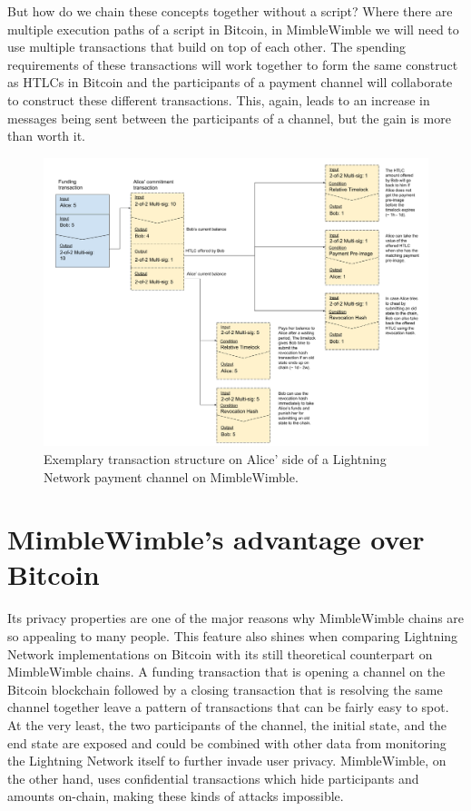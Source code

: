 \documentclass[letterpaper]{article}
\begin{document}
But how do we chain these concepts together without a script? Where there are multiple execution paths of a script in Bitcoin, in MimbleWimble we will need to use multiple transactions that build on top of each other. The spending requirements of these transactions will work together to form the same construct as HTLCs in Bitcoin and the participants of a payment channel will collaborate to construct these different transactions. This, again, leads to an increase in messages being sent between the participants of a channel, but the gain is more than worth it.

\begin{figure}[h]
	\centering
	\includegraphics[width=\textwidth]{lightning_mw_transactions_htlc}
	\caption{Exemplary transaction structure on Alice’ side of a Lightning Network payment channel on MimbleWimble.}
\end{figure}

\section{MimbleWimble's advantage over Bitcoin}
Its privacy properties are one of the major reasons why MimbleWimble chains are so appealing to many people. This feature also shines when comparing Lightning Network implementations on Bitcoin with its still theoretical counterpart on MimbleWimble chains. A funding transaction that is opening a channel on the Bitcoin blockchain followed by a closing transaction that is resolving the same channel together leave a pattern of transactions that can be fairly easy to spot. At the very least, the two participants of the channel, the initial state, and the end state are exposed and could be combined with other data from monitoring the Lightning Network itself to further invade user privacy. MimbleWimble, on the other hand, uses confidential transactions which hide participants and amounts on-chain, making these kinds of attacks impossible.
\end{document}
